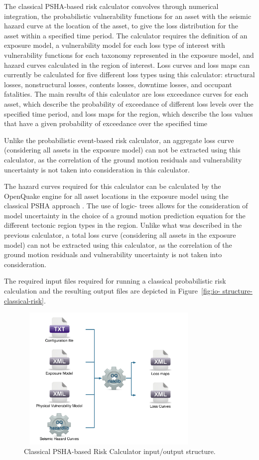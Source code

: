 The classical PSHA-based risk calculator convolves through numerical
integration, the probabilistic vulnerability functions for an asset with the
seismic hazard curve at the location of the asset, to give the loss
distribution for the asset within a specified time period. The calculator
requires the definition of an exposure model, a vulnerability model for each
loss type of interest with vulnerability functions for each taxonomy
represented in the exposure model, and hazard curves calculated in the region
of interest. Loss curves and loss maps can currently be calculated for five
different loss types using this calculator: structural losses, nonstructural
losses, contents losses, downtime losses, and occupant fatalities. The main
results of this calculator are loss exceedance curves for each asset, which
describe the probability of exceedance of different loss levels over the
specified time period, and loss maps for the region, which describe the loss
values that have a given probability of exceedance over the specified time

Unlike the probabilistic event-based risk calculator, an aggregate loss curve
(considering all assets in the exposure model) can not be extracted using this
calculator, as the correlation of the ground motion residuals and
vulnerability uncertainty is not taken into consideration in this calculator.

The hazard curves required for this calculator can be calculated by the
OpenQuake engine for all asset locations in the exposure model using the
classical PSHA approach \citep{cornell1968, mcguire1976}. The use of logic-
trees allows for the consideration of model uncertainty in the choice of a
ground motion prediction equation for the different tectonic region types in
the region. Unlike what was described in the previous calculator, a total loss
curve (considering all assets in the exposure model) can not be extracted
using this calculator, as the correlation of the ground motion residuals and
vulnerability uncertainty is not taken into consideration.

The required input files required for running a classical probabilistic risk
calculation and the resulting output files are depicted in Figure~\ref{fig:io-
structure-classical-risk}.

\begin{figure}[ht]
\centering
\includegraphics[width=9cm,height=7cm]{figures/risk/io-structure-classical-risk.pdf}
\caption{Classical PSHA-based Risk Calculator input/output structure.}
\label{fig:io-structure-classical-risk}
\end{figure}